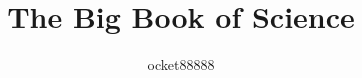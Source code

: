 
\title{The Big Book of Science}  %
\BackBody{}
\author{ocket88888}

\renewcommand{\lsISBN}{978-0-000000-00-0}                     
\renewcommand{\lsSeries}{none} %
\renewcommand{\lsSeriesNumber}{99} %
\renewcommand{\lsURL}{http://langsci-press.org/catalog/book/00} %
